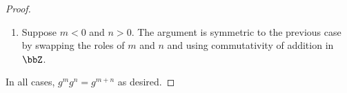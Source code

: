 \begin{proof}
\begin{enumerate}
\begin{enumerate}
                \item Suppose $m < b$, so that $b - m > 0$. We compute:
                \begin{align*}
                    g^m g^n &= g^m (g^{-1})^b \\
                    &= g^m (g^{-1})^m (g^{-1})^{b-m} \\
                    &= (g g^{-1})^m (g^{-1})^{b-m} \\
                    &= e^m (g^{-1})^{b-m} \\
                    &= (g^{-1})^{b-m},
                \end{align*}
                where the second equality uses  applied to $g^{-1}$ in the underlying monoid to write $(g^{-1})^b = (g^{-1})^m (g^{-1})^{b-m}$ (since $m \ge 0$, $b-m \ge 0$), the third equality uses that powers of $g$ and $g^{-1}$ commute in the monoid, the fourth uses $g g^{-1} = e$, and the fifth uses that $e$ is the identity. Since $m + n = m - b < 0$, we have $g^{m+n} = (g^{-1})^{-(m-n)} = (g^{-1})^{b-m}$.
            \end{enumerate}

        \item Suppose $m < 0$ and $n > 0$. The argument is symmetric to the previous case by swapping the roles of $m$ and $n$ and using commutativity of addition in $\bbZ$.
    \end{enumerate}

    In all cases, $g^m g^n = g^{m+n}$ as desired.
\end{proof}
